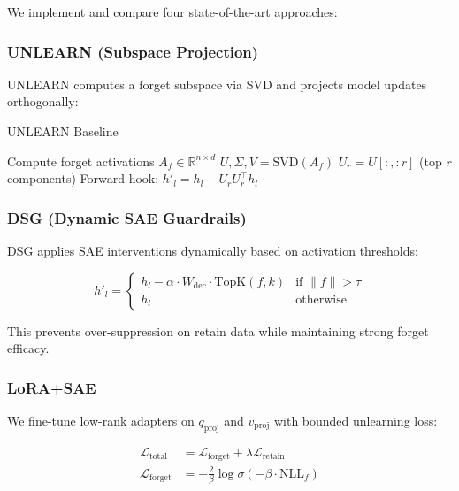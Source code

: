 \documentclass[11pt]{article}
\begin{document}
We implement and compare four state-of-the-art approaches:

\subsubsection{UNLEARN (Subspace Projection)}

UNLEARN \cite{pawelczyk2024unlearn} computes a forget subspace via SVD and projects model updates orthogonally:

\begin{algorithm}[H]
\caption{UNLEARN Baseline}
\begin{algorithmic}[1]
\STATE Compute forget activations $A_f \in \mathbb{R}^{n \times d}$
\STATE $U, \Sigma, V = \text{SVD}(A_f)$
\STATE $U_r = U[:, :r]$ (top $r$ components)
\STATE Forward hook: $h'_l = h_l - U_r U_r^\top h_l$
\end{algorithmic}
\end{algorithm}

\subsubsection{DSG (Dynamic SAE Guardrails)}

DSG \cite{dsg2025} applies SAE interventions dynamically based on activation thresholds:

\begin{equation}
    h'_l = \begin{cases}
        h_l - \alpha \cdot W_{\text{dec}} \cdot \text{TopK}(f, k) & \text{if } \|f\| > \tau \\
        h_l & \text{otherwise}
    \end{cases}
\end{equation}

This prevents over-suppression on retain data while maintaining strong forget efficacy.

\subsubsection{LoRA+SAE}

We fine-tune low-rank adapters \cite{hu2022lora} on $q_{\text{proj}}$ and $v_{\text{proj}}$ with bounded unlearning loss:

\begin{align}
    \mathcal{L}_{\text{total}} &= \mathcal{L}_{\text{forget}} + \lambda \mathcal{L}_{\text{retain}} \\
    \mathcal{L}_{\text{forget}} &= -\frac{2}{\beta} \log \sigma(-\beta \cdot \text{NLL}_f)
\end{align}
\end{document}
